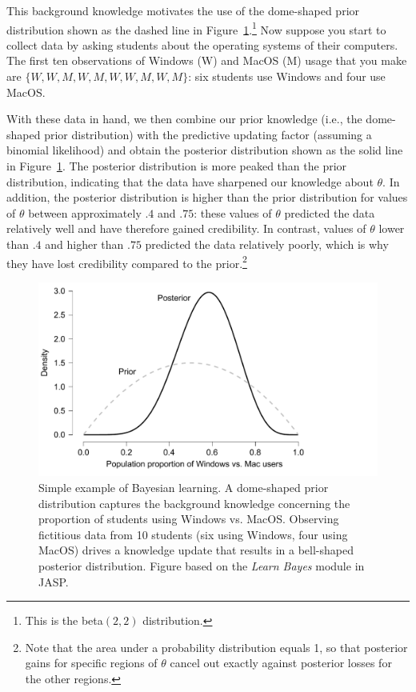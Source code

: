 \documentclass[man]{apa7}
\begin{document}
This background knowledge motivates the use of the dome-shaped prior distribution shown as the dashed line in Figure~\ref{fig:WindowsMacPriorPosterior}.\footnote{This is the beta$(2,2)$ distribution.} Now suppose you start to collect data by asking students about the operating systems of their computers. The first ten observations of Windows (W) and MacOS (M) usage that you make are $\{W, W, M, W, M, W, W, M, W, M\}$: six students use Windows and four use MacOS. 

With these data in hand, we then combine our prior knowledge (i.e., the dome-shaped prior distribution) with the predictive updating factor (assuming a binomial likelihood) and obtain the posterior distribution shown as the solid line in Figure~\ref{fig:WindowsMacPriorPosterior}. The posterior distribution is more peaked than the prior distribution, indicating that the data have sharpened our knowledge about $\theta$. In addition, the posterior distribution is higher than the prior distribution for values of $\theta$ between approximately $.4$ and $.75$: these values of $\theta$ predicted the data relatively well and have therefore gained credibility. In contrast, values of $\theta$ lower than $.4$ and higher than $.75$ predicted the data relatively poorly, which is why they have lost credibility compared to the prior.\footnote{Note that the area under a probability distribution equals 1, so that posterior gains for specific regions of $\theta$ cancel out exactly against posterior losses for the other regions.} 

\begin{figure}[h]
\begin{center}
\includegraphics[width = .785\paperwidth]{WindowsMacPriorPosterior.pdf}
\caption{Simple example of Bayesian learning. A dome-shaped prior distribution captures the background knowledge concerning the proportion of students using Windows vs. MacOS. Observing fictitious data from 10 students (six using Windows, four using MacOS) drives a knowledge update that results in a bell-shaped posterior distribution. Figure based on the \emph{Learn Bayes} module in JASP.}
\label{fig:WindowsMacPriorPosterior}
\end{center}
\end{figure}
\end{document}
